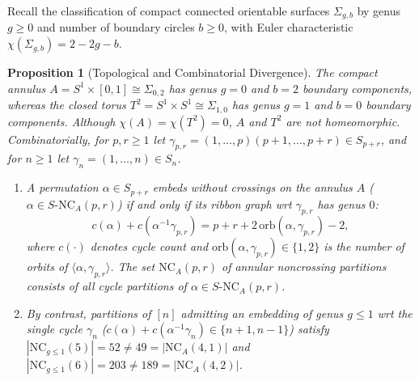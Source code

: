 \documentclass[11pt,a4paper]{article}
\newtheorem{proposition}[theorem]{Proposition}
\theoremstyle{definition}
\theoremstyle{remark}
\newcommand{\NCA}{\mathrm{NC}_A}
\newcommand{\SNCA}{S\text{-}\mathrm{NC}_A}
\newcommand{\NC}{\mathrm{NC}}
\newcommand{\orb}{\mathrm{orb}}
\begin{document}
Recall the classification of compact connected orientable surfaces $\Sigma_{g,b}$ by genus $g \ge 0$ and number of boundary circles $b \ge 0$, with Euler characteristic $\chi(\Sigma_{g,b}) = 2 - 2g - b$.

\begin{proposition}[Topological and Combinatorial Divergence]\label{prop:topology}
The compact annulus $A = S^1 \times [0,1] \cong \Sigma_{0,2}$ has genus $g = 0$ and $b = 2$ boundary components, whereas the closed torus $T^2 = S^1 \times S^1 \cong \Sigma_{1,0}$ has genus $g = 1$ and $b = 0$ boundary components. Although $\chi(A) = \chi(T^2) = 0$, $A$ and $T^2$ are not homeomorphic. Combinatorially, for $p, r \ge 1$ let $\gamma_{p,r} = (1,\dots,p)(p+1,\dots,p+r) \in S_{p+r}$, and for $n \ge 1$ let $\gamma_n = (1,\dots,n) \in S_n$.
\begin{enumerate}
  \item[(a)] A permutation $\alpha \in S_{p+r}$ embeds without crossings on the annulus $A$ ($\alpha \in \SNCA(p,r)$) if and only if its ribbon graph wrt $\gamma_{p,r}$ has genus $0$:
  \begin{equation}\label{eq:annular-genus0}
    c(\alpha) + c(\alpha^{-1}\gamma_{p,r}) = p + r + 2\,\orb(\alpha,\gamma_{p,r}) - 2,
  \end{equation}
  where $c(\cdot)$ denotes cycle count and $\orb(\alpha,\gamma_{p,r}) \in \{1,2\}$ is the number of orbits of $\langle \alpha, \gamma_{p,r}\rangle$. The set $\NCA(p,r)$ of annular noncrossing partitions consists of all cycle partitions of $\alpha \in \SNCA(p,r)$.
  \item[(b)] By contrast, partitions of $[n]$ admitting an embedding of genus $g \le 1$ wrt the single cycle $\gamma_n$ ($c(\alpha) + c(\alpha^{-1}\gamma_n) \in \{n+1, n-1\}$) satisfy $|\NC_{g \le 1}(5)| = 52 \neq 49 = |\NCA(4,1)|$ and $|\NC_{g \le 1}(6)| = 203 \neq 189 = |\NCA(4,2)|$.
\end{enumerate}
\end{proposition}
\end{document}
